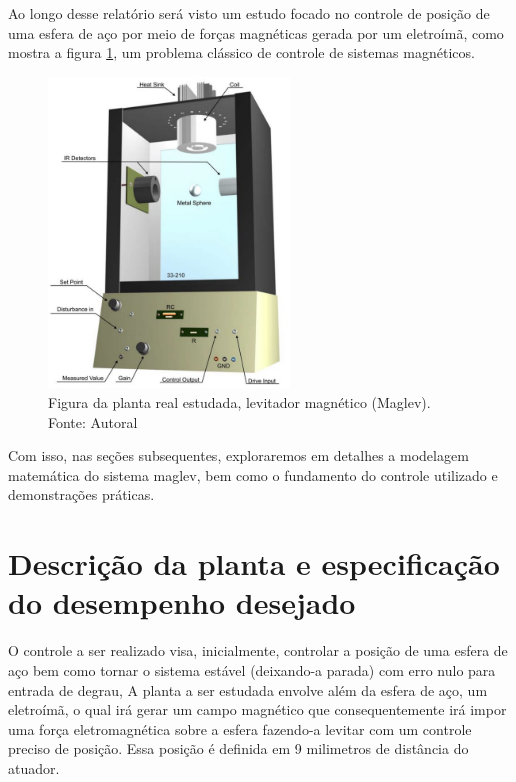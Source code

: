\documentclass{ifacconf}
\begin{document}
Ao longo desse relatório será visto um estudo focado no controle de posição de uma esfera de aço por meio de forças magnéticas 
gerada por um eletroímã, como mostra a figura \ref{fig:planta_padrao}, um problema
clássico de controle de sistemas magnéticos. 

\begin{figure}[!htb]
  \begin{center}
  \includegraphics[width=6.4cm]{figures/planta_padrao.png}    %
  \caption{Figura da planta real estudada, levitador magnético (Maglev). Fonte: Autoral} 
  \label{fig:planta_padrao}
  \end{center}
\end{figure}

Com isso, nas seções subsequentes, exploraremos em detalhes a modelagem matemática do sistema
maglev, bem como o fundamento do controle utilizado e demonstrações práticas.

\section{Descrição da planta e especificação do desempenho desejado}

O controle a ser realizado visa, inicialmente, controlar a posição de uma esfera de aço bem como tornar o sistema estável (deixando-a parada) com erro nulo para entrada de degrau, 
A planta a ser estudada envolve além da esfera de aço, um eletroímã, o qual irá gerar um campo magnético que
consequentemente irá impor uma força eletromagnética sobre a esfera fazendo-a levitar com um controle preciso de posição. Essa posição é definida em 9 milimetros de distância
do atuador.
\end{document}
